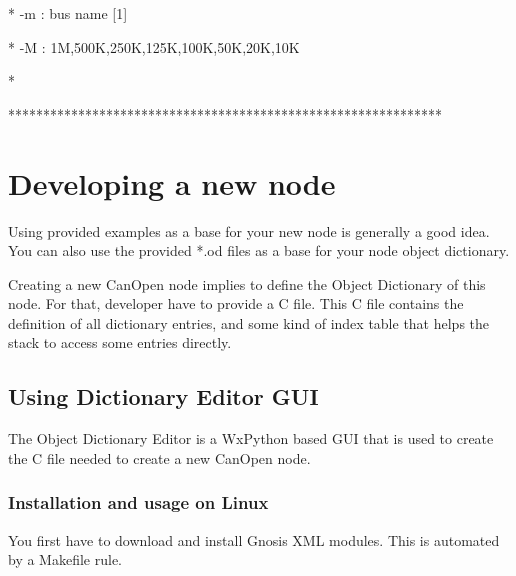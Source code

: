 \documentclass[a4paper,12pt]{book}
\begin{document}
{\ttfamily
* \space \space \space \space {}-m : bus name [{\textquotedbl}1{\textquotedbl}]
\space \space \space \space \space \space \space \space \space \space \space \space \space \space \space \space \space \space \space \space \space \space \space \space \space \space \space \space \space \space \space \space \space \space \space *}

{\ttfamily
* \space \space \space \space {}-M : 1M,500K,250K,125K,100K,50K,20K,10K
\space \space \space \space \space \space \space \space \space \space \space \space \space \space \space *}

{\ttfamily
*
\space \space \space \space \space \space \space \space \space \space \space \space \space \space \space \space \space \space \space \space \space \space \space \space \space \space \space \space \space \space \space \space \space \space \space \space \space \space \space \space \space \space \space \space \space \space \space \space \space \space \space \space \space \space \space \space \space \space \space *}

{\ttfamily
**************************************************************}

\section{Developing a new node}
Using provided examples as a base for your new node is generally a good
idea. You can also use the provided *.od files as a base for your node
object dictionary.

Creating a new CanOpen node implies to define the Object Dictionary of
this node. For that, developer have to provide a C file. This C file
contains the definition of all dictionary entries, and some kind of
index table that helps the stack to access some entries directly.

\subsection{Using Dictionary Editor GUI}
The Object Dictionary Editor is a WxPython based GUI that is used to
create the C file needed to create a new CanOpen node. 

\subsubsection{Installation and usage on Linux}
You first have to download and install Gnosis XML modules. This is
automated by a Makefile rule.
\end{document}
